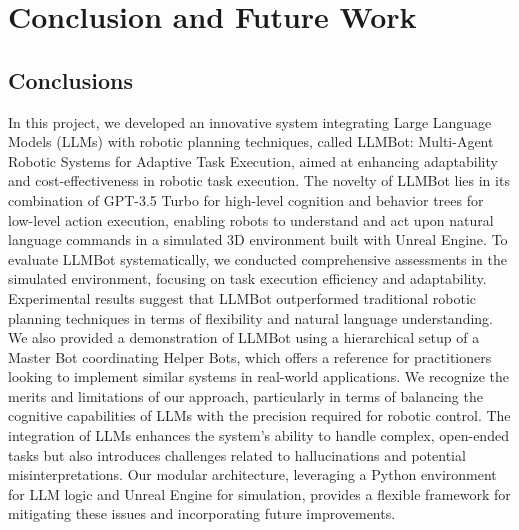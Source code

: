 \documentclass[pdflatex,sn-mathphys-num]{sn-jnl}%
\theoremstyle{thmstyleone}
\theoremstyle{thmstyletwo}%
\theoremstyle{thmstylethree}%
\begin{document}
\section{Conclusion and Future Work}

\subsection{Conclusions}
In this project, we developed an innovative system integrating Large Language Models (LLMs) with robotic planning techniques, called LLMBot: Multi-Agent Robotic Systems for Adaptive Task Execution, aimed at enhancing adaptability and cost-effectiveness in robotic task execution. The novelty of LLMBot lies in its combination of GPT-3.5 Turbo for high-level cognition and behavior trees for low-level action execution, enabling robots to understand and act upon natural language commands in a simulated 3D environment built with Unreal Engine.
To evaluate LLMBot systematically, we conducted comprehensive assessments in the simulated environment, focusing on task execution efficiency and adaptability. Experimental results suggest that LLMBot outperformed traditional robotic planning techniques in terms of flexibility and natural language understanding. We also provided a demonstration of LLMBot using a hierarchical setup of a Master Bot coordinating Helper Bots, which offers a reference for practitioners looking to implement similar systems in real-world applications.
We recognize the merits and limitations of our approach, particularly in terms of balancing the cognitive capabilities of LLMs with the precision required for robotic control. The integration of LLMs enhances the system's ability to handle complex, open-ended tasks but also introduces challenges related to hallucinations and potential misinterpretations. Our modular architecture, leveraging a Python environment for LLM logic and Unreal Engine for simulation, provides a flexible framework for mitigating these issues and incorporating future improvements.
\end{document}
